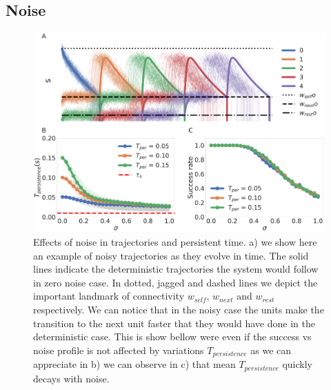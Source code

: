\documentclass[10pt,a4paper]{article}
\begin{document}
\subsection{Noise}

\begin{figure}[H]
\centering
\includegraphics[scale=0.17]{noise_diagram.pdf}
\caption{Effects of noise in trajectories and persistent time. a) we show here an example of noisy trajectories as they evolve in time. The solid lines indicate the deterministic trajectories the system would follow in zero noise case. In dotted, jagged and dashed lines we depict the important landmark of connectivity $w_{self}$, $w_{next}$ and $w_{rest}$ respectively. We can notice that in the noisy case the units make the transition to the next unit faster that they would have done in the deterministic case. This is show bellow were even if the success vs noise profile is not affected by variations $T_{persistence}$  as we can appreciate in b) we can observe in c) that mean $T_{persistence}$ quickly decays with noise.}
\label{fig:noise_scheme}
\end{figure}
\end{document}
